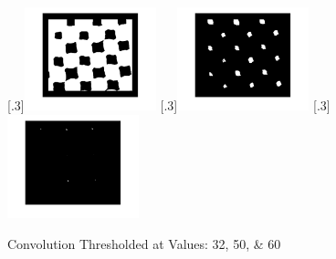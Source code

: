 \documentclass[a4paper]{article}
\begin{document}
	\begin{figure}[H]
		\centering
		[.3\linewidth]{\includegraphics[height=3cm]{Results/Q3/a/qaThreshVal32.jpg}}%
		[.3\linewidth]{\includegraphics[height=3cm]{Results/Q3/a/qaThreshVal50.jpg}}%
		[.3\linewidth]{\includegraphics[height=3cm]{Results/Q3/a/qaThreshVal60.jpg}}%
		\caption{Convolution Thresholded at Values: 32, 50, \& 60}
		\label{fig:}
	\end{figure}
\end{document}
